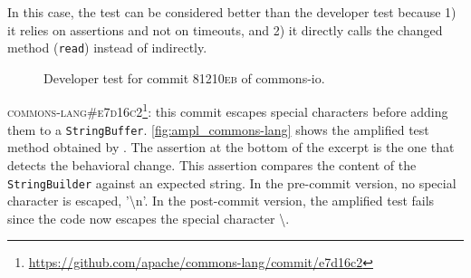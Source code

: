 In this case, the \DCI test can be considered better than the developer test because
1) it relies on assertions and not on timeouts, and
2) it directly calls the changed method (\texttt{read}) instead of indirectly. 

\begin{figure}[h]
\centering
{}
\caption{Developer test for commit \textsc{81210eb} of commons-io.}
\label{fig:diff_commons-io}
\end{figure}

\textsc{commons-lang\#e7d16c2}\footnote{\url{https://github.com/apache/commons-lang/commit/e7d16c2}}: this commit escapes special characters before adding them to a \texttt{StringBuffer}.
\autoref{fig:ampl_commons-lang} shows the amplified test method obtained by \DCII.
The assertion at the bottom of the excerpt is the one that detects the behavioral change.
This assertion compares the content of the \texttt{StringBuilder} against an expected string.
In the pre-commit version, no special character is escaped, \eg '\textbackslash n'.
In the post-commit version, the amplified test fails since the code now escapes the special character \textbackslash.

